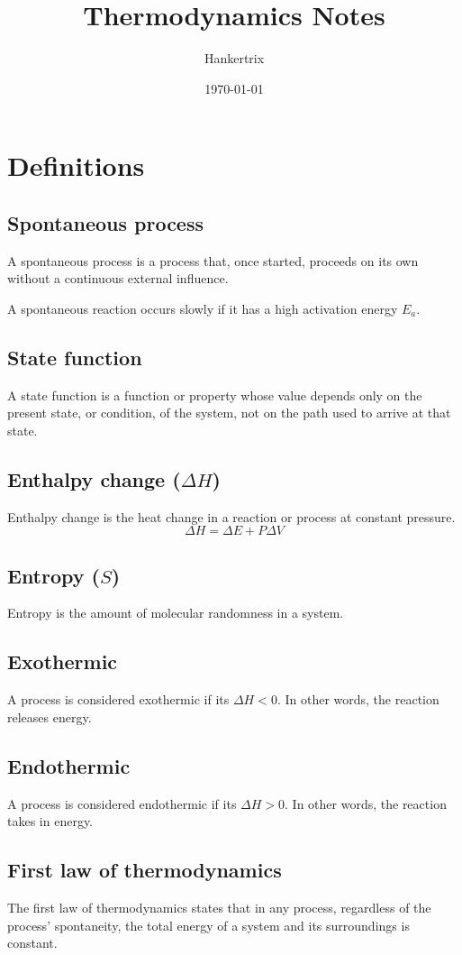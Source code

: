 \documentclass[11pt]{article}
\author{Hankertrix}
\date{\today}
\title{Thermodynamics Notes}
\begin{document}
\maketitle
\setcounter{tocdepth}{2}
\tableofcontents \clearpage\section{Definitions}
\label{sec:orgd579f59}

\subsection{Spontaneous process}
\label{sec:org81d0a13}
A spontaneous process is a process that, once started, proceeds on its own without a continuous external influence.


A spontaneous reaction occurs slowly if it has a high activation energy \(E_a\).
\subsection{State function}
\label{sec:org07bb188}
A state function is a function or property whose value depends only on the present state, or condition, of the system, not on the path used to arrive at that state.
\subsection{Enthalpy change (\(\Delta H\))}
\label{sec:org1a767aa}
Enthalpy change is the heat change in a reaction or process at constant pressure.
\[\Delta H = \Delta E + P \Delta V\]
\subsection{Entropy (\(S\))}
\label{sec:org189cdba}
Entropy is the amount of molecular randomness in a system.
\subsection{Exothermic}
\label{sec:org4efdfa5}
A process is considered exothermic if its \(\Delta H < 0\). In other words, the reaction releases energy.
\subsection{Endothermic}
\label{sec:orga12d26a}
A process is considered endothermic if its \(\Delta H > 0\). In other words, the reaction takes in energy.
\subsection{First law of thermodynamics}
\label{sec:org10fc1de}
The first law of thermodynamics states that in any process, regardless of the process' spontaneity, the total energy of a system and its surroundings is constant.
\end{document}
